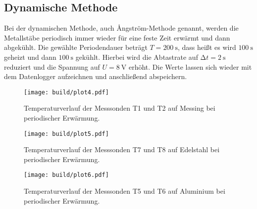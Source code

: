 \subsection{Dynamische Methode}
Bei der dynamischen Methode, auch Ångström-Methode genannt, werden die Metallstäbe periodisch immer wieder für eine feste Zeit erwärmt und dann abgekühlt. Die gewählte Periodendauer beträgt $T = \SI{200}{\second}$, dass heißt es wird $\SI{100}{\second}$ geheizt und dann $\SI{100}{\second}$ gekühlt.  Hierbei wird die Abtastrate auf $\increment t = \SI{2}{\second}$ reduziert und die Spannung auf $U = \SI{8}{\volt}$ erhöht.
Die Werte lassen sich wieder mit dem Datenlogger aufzeichnen und anschließend abspeichern.


\begin{figure}
    \centering
    \texttt{[image: build/plot4.pdf]}
    \caption{Temperaturverlauf der Messsonden T1 und T2 auf Messing bei periodischer Erwärmung.} 
    \label{fig:plot4}
\end{figure}


\begin{figure}
    \centering
    \texttt{[image: build/plot5.pdf]}
    \caption{Temperaturverlauf der Messsonden T7 und T8 auf Edelstahl bei periodischer Erwärmung.} 
    \label{fig:plot5}
\end{figure}



\begin{figure}
    \centering
    \texttt{[image: build/plot6.pdf]}
    \caption{Temperaturverlauf der Messsonden T5 und T6 auf Aluminium bei periodischer Erwärmung.} 
    \label{fig:plot6}
\end{figure}